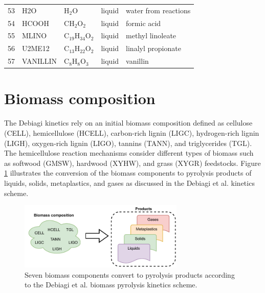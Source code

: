 \documentclass[12pt,titlepage]{article}
\begin{document}
\begin{center}
\begin{longtable}{cllll}
    53 & H2O            & H$_2$O                  & \cellcolor{blue!25}liquid        & water from reactions \\
    54 & HCOOH          & CH$_2$O$_2$             & \cellcolor{blue!25}liquid        & formic acid \\
    55 & MLINO          & C$_{19}$H$_{34}$O$_2$   & \cellcolor{blue!25}liquid        & methyl linoleate \\
    56 & U2ME12         & C$_{13}$H$_{22}$O$_2$   & \cellcolor{blue!25}liquid        & linalyl propionate \\
    57 & VANILLIN       & C$_8$H$_8$O$_3$         & \cellcolor{blue!25}liquid        & vanillin \\
    \bottomrule
\end{longtable}
\end{center}

\section{Biomass composition}

The Debiagi kinetics rely on an initial biomass composition defined as cellulose (CELL), hemicellulose (HCELL), carbon-rich lignin (LIGC), hydrogen-rich lignin (LIGH), oxygen-rich lignin (LIGO), tannins (TANN), and triglycerides (TGL). The hemicellulose reaction mechanisms consider different types of biomass such as softwood (GMSW), hardwood (XYHW), and grass (XYGR) feedstocks. Figure \ref{fig:biocomp1} illustrates the conversion of the biomass components to pyrolysis products of liquids, solids, metaplastics, and gases as discussed in the Debiagi et al. kinetics scheme.

\begin{figure}[H]
    \centering
    \includegraphics[width=0.7\textwidth]{figures/biocomp1.pdf}
    \caption{Seven biomass components convert to pyrolysis products according to the Debiagi et al. biomass pyrolysis kinetics scheme.}
    \label{fig:biocomp1}
\end{figure}
\end{document}
